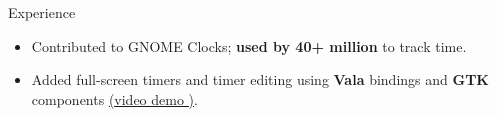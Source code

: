 \documentclass{resume} %
\begin{document}
\begin{workSection}{Experience}
\begin{itemize}
		\item Contributed to GNOME Clocks; \textbf{used by 40+ million} to track  time. %
		\item Added 
		full-screen timers and timer editing using \textbf{Vala} bindings and \textbf{GTK} components \href{https://youtu.be/fDzYWusOLow}{(\underline{video demo \faExternalLink})}. %
	\end{itemize}
	

\end{workSection}
\end{document}

